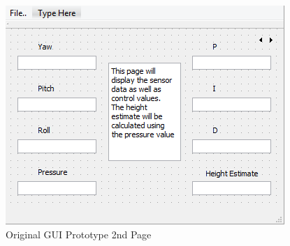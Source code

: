 \begin{figure}[H]
	\label{fig:OGUIPage2}
	\includegraphics[width=\linewidth]{OLDGUI2.png}
	\caption{Original GUI Prototype 2nd Page}
\end{figure}
